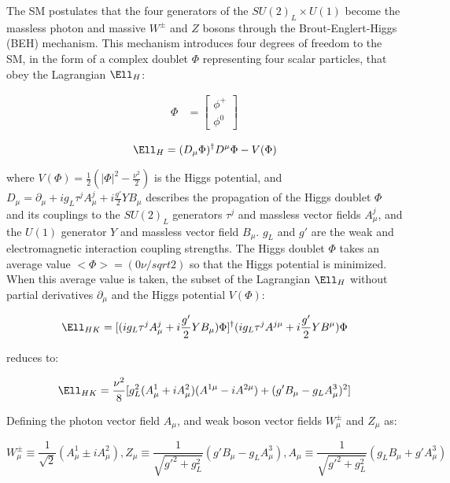 The SM postulates that the four generators of the $SU(2)_{L} \times U(1)$ become the massless photon and 
massive $W^{\pm}$ and $Z$ bosons through the Brout-Englert-Higgs (BEH) mechanism.  This mechanism 
introduces four degrees of freedom to the SM, in the form of a complex doublet $\Phi$ representing four scalar 
particles, that obey the Lagrangian $\Ell_{H}$:

\begin{align}
	\Phi &= \begin{bmatrix}
	\phi^{+} \\
	\phi^{0}
	\end{bmatrix}
\end{align}

\begin{equation}
	\Ell_{H} = (D_{\mu}\Phi)^{\dagger}D^{\mu}\Phi - V(\Phi)
\end{equation}

where $V(\Phi) = \frac{1}{2}(|\Phi|^{2} - \frac{\nu^{2}}{2})$ is the Higgs potential, and 
$D_{\mu} = \partial_{\mu} + ig_{L}\tau^{j}A^{j}_{\mu} + i\frac{g'}{2}YB_{\mu}$ describes the propagation 
of the Higgs doublet $\Phi$ and its couplings to the $SU(2)_L$ generators $\tau^{j}$ and massless vector 
fields $A^{j}_{\mu}$, and the $U(1)$ generator $Y$ and massless vector field $B_{\mu}$.  $g_{L}$ and 
$g'$ are the weak and electromagnetic interaction coupling strengths.  The Higgs doublet $\Phi$ takes an 
average value $<\Phi> = (0  \nu/sqrt{2})$ so that the Higgs potential is minimized.  When this average 
value is taken, the subset of the Lagrangian $\Ell_{H}$ without partial derivatives $\partial_{\mu}$ and 
the Higgs potential $V(\Phi)$:

\begin{equation}
	\Ell_{HK} = [(ig_{L}\tau^{j}A^{j}_{\mu} + i\frac{g'}{2}YB_{\mu})\Phi]^{\dagger}(ig_{L}\tau^{j}A^{j\mu} + i\frac{g'}{2}YB^{\mu})\Phi
\end{equation}

reduces to:

\begin{equation}
	\Ell_{HK} = \frac{\nu^{2}}{8}[g^{2}_{L}(A^{1}_{\mu} + iA^{2}_{\mu})(A^{1\mu} - iA^{2\mu}) + (g'B_{\mu} - g_{L}A^{3}_{\mu})^{2}]
\end{equation}

Defining the photon vector field $A_{\mu}$, and weak boson vector fields $W^{\pm}_{\mu}$ and $Z_{\mu}$ as:

\begin{equation}
	W^{\pm}_{\mu} \equiv \frac{1}{\sqrt{2}}(A^{1}_{\mu} \pm iA^{2}_{\mu}), 
	Z_{\mu} \equiv \frac{1}{\sqrt{g'^{2} + g^{2}_{L}}}(g'B_{\mu} - g_{L}A^{3}_{\mu}), 
	A_{\mu} \equiv \frac{1}{\sqrt{g'^{2} + g^{2}_{L}}}(g_{L}B_{\mu} + g'A^{3}_{\mu})
\end{equation}

